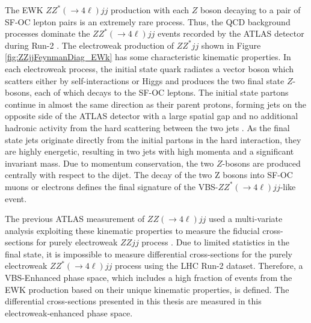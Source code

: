 The EWK $ZZ^*(\rightarrow 4\ell ) jj$ production with each $Z$ boson decaying to a pair of SF-OC lepton pairs is an extremely rare process. Thus, the QCD background processes dominate the $ZZ^*(\rightarrow 4\ell ) jj$ events recorded by the ATLAS detector during Run-2 \cite{ATLASZZjj}. The electroweak production of $ZZ^*jj$ shown in Figure \ref{fig:ZZjjFeynmanDiag_EWk} has some characteristic kinematic properties. In each electroweak process, the initial state quark radiates a vector boson which scatters either by self-interactions or Higgs and produces the two final state $Z$-bosons, each of which decays to the SF-OC leptons. The initial state partons continue in almost the same direction as their parent protons, forming jets on the opposite side of the ATLAS detector with a large spatial gap and no additional hadronic activity from the hard scattering between the two jets \cite{RapidityGapCite}. As the final state jets originate directly from the initial partons in the hard interaction, they are highly energetic, resulting in two jets with high momenta and a significant invariant mass\cite{RapidityGapCite}. Due to momentum conservation, the two $Z$-bosons are produced centrally with respect to the dijet. The decay of the two Z bosons into SF-OC muons or electrons defines the final signature of the VBS-$ZZ^*(\rightarrow 4\ell ) jj$-like event.

The previous ATLAS measurement of $ZZ(\rightarrow 4\ell ) jj$ used a multi-variate analysis exploiting these kinematic properties to measure the fiducial cross-sections for purely electroweak $ZZjj$ process \cite{ATLASZZjj}. Due to limited statistics in the final state, it is impossible to measure differential cross-sections for the purely electroweak $ZZ^*(\rightarrow 4\ell ) jj$ process using the LHC Run-2 dataset. Therefore, a VBS-Enhanced phase space, which includes a high fraction of events from the EWK production based on their unique kinematic properties, is defined. The differential cross-sections presented in this thesis are measured in this electroweak-enhanced phase space. 
